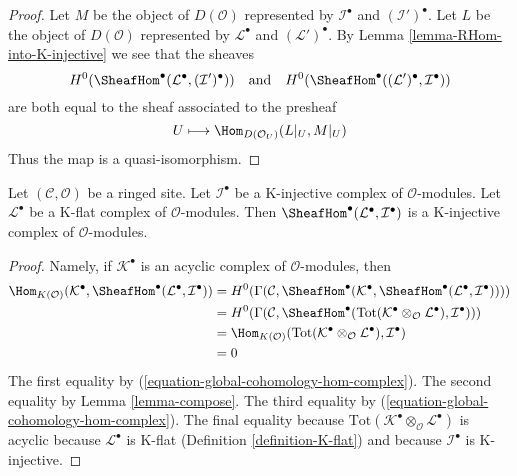 \begin{proof}
Let $M$ be the object of $D(\mathcal{O})$ represented by
$\mathcal{I}^\bullet$ and $(\mathcal{I}')^\bullet$.
Let $L$ be the object of $D(\mathcal{O})$ represented by
$\mathcal{L}^\bullet$ and $(\mathcal{L}')^\bullet$.
By Lemma \ref{lemma-RHom-into-K-injective}
we see that the sheaves
$$
H^0(\SheafHom^\bullet(\mathcal{L}^\bullet, (\mathcal{I}')^\bullet))
\quad\text{and}\quad
H^0(\SheafHom^\bullet((\mathcal{L}')^\bullet, \mathcal{I}^\bullet))
$$
are both equal to the sheaf associated to the presheaf
$$
U \longmapsto \Hom_{D(\mathcal{O}_U)}(L|_U, M|_U)
$$
Thus the map is a quasi-isomorphism.
\end{proof}

\begin{lemma}
\label{lemma-RHom-from-K-flat-into-K-injective}
Let $(\mathcal{C}, \mathcal{O})$ be a ringed site. Let $\mathcal{I}^\bullet$
be a K-injective complex of $\mathcal{O}$-modules. Let
$\mathcal{L}^\bullet$ be a K-flat complex of $\mathcal{O}$-modules.
Then $\SheafHom^\bullet(\mathcal{L}^\bullet, \mathcal{I}^\bullet)$
is a K-injective complex of $\mathcal{O}$-modules.
\end{lemma}

\begin{proof}
Namely, if $\mathcal{K}^\bullet$ is an acyclic complex of
$\mathcal{O}$-modules, then
\begin{align*}
\Hom_{K(\mathcal{O})}(\mathcal{K}^\bullet,
\SheafHom^\bullet(\mathcal{L}^\bullet, \mathcal{I}^\bullet))
& =
H^0(\Gamma(\mathcal{C},
\SheafHom^\bullet(\mathcal{K}^\bullet,
\SheafHom^\bullet(\mathcal{L}^\bullet, \mathcal{I}^\bullet)))) \\
& =
H^0(\Gamma(\mathcal{C}, \SheafHom^\bullet(\text{Tot}(
\mathcal{K}^\bullet \otimes_\mathcal{O} \mathcal{L}^\bullet),
\mathcal{I}^\bullet))) \\
& =
\Hom_{K(\mathcal{O})}(
\text{Tot}(\mathcal{K}^\bullet \otimes_\mathcal{O} \mathcal{L}^\bullet),
\mathcal{I}^\bullet) \\
& =
0
\end{align*}
The first equality by (\ref{equation-global-cohomology-hom-complex}).
The second equality by Lemma \ref{lemma-compose}.
The third equality by (\ref{equation-global-cohomology-hom-complex}).
The final equality because
$\text{Tot}(\mathcal{K}^\bullet \otimes_\mathcal{O} \mathcal{L}^\bullet)$
is acyclic because $\mathcal{L}^\bullet$ is K-flat
(Definition \ref{definition-K-flat}) and because $\mathcal{I}^\bullet$
is K-injective.
\end{proof}








